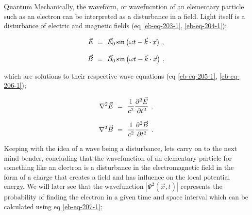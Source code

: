 \documentclass{article}
\begin{document}
Quantum Mechanically, the waveform, or wavefucntion of an elementary particle such as an electron can be interpreted as a disturbance in a field. Light itself is a disturbance of electric and magnetic fields (eq \ref{eb-eq-203-1}, \ref{eb-eq-204-1});

\begin{equation} \label{eb-eq-203-1}
\vec{E} \hspace{0.125cm} = \hspace{0.125cm}  \vec{E_{0}}\sin{\big(\omega t - \vec{k}\cdot\vec{x}\big)} \hspace{0.125cm} , 
\end{equation}

\begin{equation} \label{eb-eq-204-1}
\vec{B} \hspace{0.125cm} = \hspace{0.125cm}  \vec{B_{0}}\sin{\big(\omega t - \vec{k}\cdot\vec{x}\big)} \hspace{0.125cm} , 
\end{equation}

which are solutions to their respective wave equations (eq \ref{eb-eq-205-1}, \ref{eb-eq-206-1});

\begin{equation} \label{eb-eq-205-1}
\nabla^{2}\vec{E} \hspace{0.125cm} = \hspace{0.125cm} \frac{1}{c^{2}}\frac{\partial^{2}{\vec{E}}}{\partial{t^{2}}} \hspace{0.125cm} , 
\end{equation}

\begin{equation} \label{eb-eq-206-1}
\nabla^{2}\vec{B} \hspace{0.125cm} = \hspace{0.125cm} \frac{1}{c^{2}}\frac{\partial^{2}{\vec{B}}}{\partial{t^{2}}} \hspace{0.125cm} . 
\end{equation}

Keeping with the idea of a wave being a disturbance, lets carry on to the next mind bender, concluding that the wavefunction of an elementary particle for something like an electron is a disturbance in the electromagnetic field in the form of a charge that creates a field and has influence on the local potential energy. We will later see that the wavefunction \begin{math} |\Psi^2(\vec{x},t)| \end{math} represents the probability of finding the electron in a given time and space interval which can be calculated using eq \ref{eb-eq-207-1};
\end{document}
